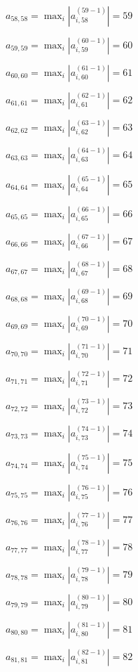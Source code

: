 \documentclass[a4paper,12pt]{article}
\begin{document}
$a _{ 58, 58 } =  \max _i |a _{ i, 58 } ^{ (59 - 1) } | = 59$

$a _{ 59, 59 } =  \max _i |a _{ i, 59 } ^{ (60 - 1) } | = 60$

$a _{ 60, 60 } =  \max _i |a _{ i, 60 } ^{ (61 - 1) } | = 61$

$a _{ 61, 61 } =  \max _i |a _{ i, 61 } ^{ (62 - 1) } | = 62$

$a _{ 62, 62 } =  \max _i |a _{ i, 62 } ^{ (63 - 1) } | = 63$

$a _{ 63, 63 } =  \max _i |a _{ i, 63 } ^{ (64 - 1) } | = 64$

$a _{ 64, 64 } =  \max _i |a _{ i, 64 } ^{ (65 - 1) } | = 65$

$a _{ 65, 65 } =  \max _i |a _{ i, 65 } ^{ (66 - 1) } | = 66$

$a _{ 66, 66 } =  \max _i |a _{ i, 66 } ^{ (67 - 1) } | = 67$

$a _{ 67, 67 } =  \max _i |a _{ i, 67 } ^{ (68 - 1) } | = 68$

$a _{ 68, 68 } =  \max _i |a _{ i, 68 } ^{ (69 - 1) } | = 69$

$a _{ 69, 69 } =  \max _i |a _{ i, 69 } ^{ (70 - 1) } | = 70$

$a _{ 70, 70 } =  \max _i |a _{ i, 70 } ^{ (71 - 1) } | = 71$

$a _{ 71, 71 } =  \max _i |a _{ i, 71 } ^{ (72 - 1) } | = 72$

$a _{ 72, 72 } =  \max _i |a _{ i, 72 } ^{ (73 - 1) } | = 73$

$a _{ 73, 73 } =  \max _i |a _{ i, 73 } ^{ (74 - 1) } | = 74$

$a _{ 74, 74 } =  \max _i |a _{ i, 74 } ^{ (75 - 1) } | = 75$

$a _{ 75, 75 } =  \max _i |a _{ i, 75 } ^{ (76 - 1) } | = 76$

$a _{ 76, 76 } =  \max _i |a _{ i, 76 } ^{ (77 - 1) } | = 77$

$a _{ 77, 77 } =  \max _i |a _{ i, 77 } ^{ (78 - 1) } | = 78$

$a _{ 78, 78 } =  \max _i |a _{ i, 78 } ^{ (79 - 1) } | = 79$

$a _{ 79, 79 } =  \max _i |a _{ i, 79 } ^{ (80 - 1) } | = 80$

$a _{ 80, 80 } =  \max _i |a _{ i, 80 } ^{ (81 - 1) } | = 81$

$a _{ 81, 81 } =  \max _i |a _{ i, 81 } ^{ (82 - 1) } | = 82$
\end{document}

